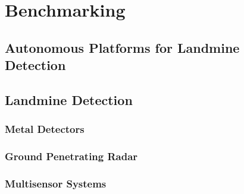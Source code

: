 \documentclass[main.tex]{subfiles}
\begin{document}
\chapter{Benchmarking}

\section{Autonomous Platforms for Landmine Detection}

\section{Landmine Detection}

\subsection{Metal Detectors}

\subsection{Ground Penetrating Radar}

\subsection{Multisensor Systems}
\end{document}

